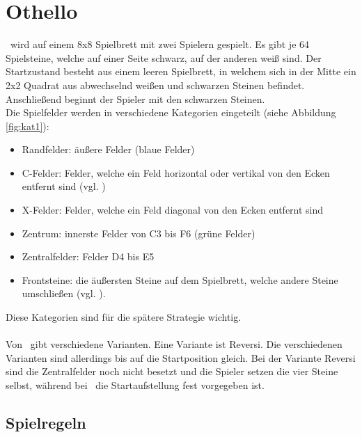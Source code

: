 \chapter{Othello}
\label{othello-chapter}
\ot\ wird auf einem 8x8 Spielbrett mit zwei Spielern gespielt. Es gibt je 64 Spielsteine, welche auf einer Seite schwarz, auf der anderen weiß sind. Der Startzustand besteht aus einem leeren Spielbrett, in welchem sich in der Mitte ein 2x2 Quadrat aus abwechselnd weißen und schwarzen Steinen befindet. Anschließend beginnt der Spieler mit den schwarzen Steinen.
\\Die Spielfelder werden in verschiedene Kategorien eingeteilt (siehe Abbildung
 \ref{fig:kat1}):
\begin{itemize}
\item Randfelder: äußere Felder (blaue Felder) \cite{wikibooks}
\item C-Felder: Felder, welche ein Feld horizontal oder vertikal von den Ecken entfernt sind (vgl. \cite{Berg})
\item X-Felder: Felder, welche ein Feld diagonal von den Ecken entfernt sind \cite{wikibooks}
\item Zentrum: innerste Felder von C3 bis F6 (grüne Felder) \cite{wikibooks}
\item Zentralfelder: Felder D4 bis E5 \cite{wikibooks}
\item Frontsteine: die äußersten Steine auf dem Spielbrett, welche andere Steine umschließen (vgl. \cite{Ortiz.}).
\end{itemize}
Diese Kategorien sind für die spätere Strategie wichtig.
\\
\\Von \ot\ gibt verschiedene Varianten. Eine Variante ist Reversi.
Die verschiedenen Varianten sind allerdings bis auf die Startposition gleich. Bei der Variante Reversi sind die Zentralfelder noch nicht besetzt und die Spieler setzen die vier Steine selbst, während bei \ot\ die Startaufstellung fest vorgegeben ist.

\section{Spielregeln}

